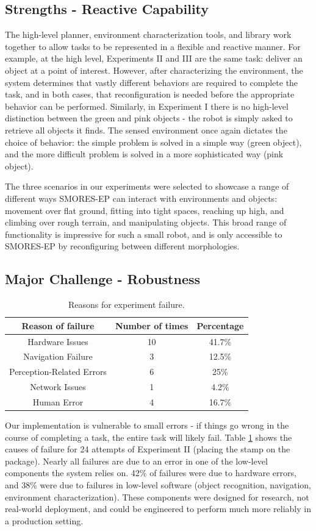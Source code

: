 \documentclass[conference]{IEEEtran}
\begin{document}
\subsection{Strengths - Reactive Capability}
%
The high-level planner, environment characterization tools, and library work together to allow tasks to be represented in a flexible and reactive manner. For example, at the high level, Experiments II and III are the same task: deliver an object at a point of interest.  However, after characterizing the environment, the system determines that vastly different behaviors are required to complete the task, and in both cases, that reconfiguration is needed before the appropriate behavior can be performed. Similarly, in Experiment I there is no high-level distinction between the green and pink objects - the robot is simply asked to retrieve all objects it finds.  The sensed environment once again dictates the choice of behavior: the simple problem is solved in a simple way (green object), and the more difficult problem is solved in a more sophisticated way (pink object).

The three scenarios in our experiments were selected to showcase a range of different ways SMORES-EP can interact with environments and objects: movement over flat ground, fitting into tight spaces, reaching up high, and climbing over rough terrain, and manipulating objects.  This broad range of functionality is impressive for such a small robot, and is only accessible to SMORES-EP by reconfiguring between different morphologies.
%
\subsection{Major Challenge - Robustness}
%
\begin{table}
\centering
\begin{tabular}{|c|c|c|}
\hline
\textbf{Reason of failure} & \textbf{Number of times} & \textbf{Percentage}\\ 
\hline
Hardware Issues & 10 & 41.7\% \\ 
\hline
Navigation Failure & 3 & 12.5\% \\ 
\hline
Perception-Related Errors & 6 & 25\% \\ 
\hline
Network Issues & 1 & 4.2\% \\ 
\hline
Human Error & 4 & 16.7\% \\ 
\hline
\end{tabular}
\caption{Reasons for experiment failure.}
\label{table:errors}
\end{table}
%
Our implementation is vulnerable to small errors - if things go wrong in the course of completing a task, the entire task will likely fail. 
Table \ref{table:errors} shows the causes of failure for 24 attempts of Experiment II (placing the stamp on the package).  
Nearly all failures are due to an error in one of the low-level components the system relies on.
42\% of failures were due to hardware errors, and 38\% were due to failures in low-level software (object recognition, navigation, environment characterization). 
These components were designed for research, not real-world deployment, and could be engineered to perform much more reliably in a production setting.
\end{document}
